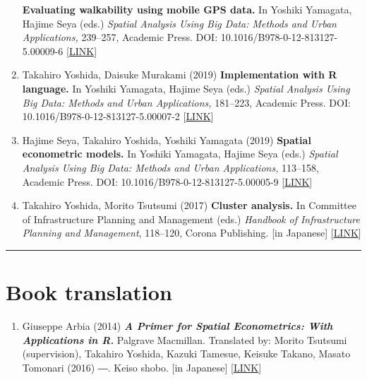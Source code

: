 \documentclass[]{book}
\providecommand{\tightlist}{%
  \setlength{\itemsep}{0pt}\setlength{\parskip}{0pt}}
\begin{document}
\begin{enumerate}
  \textbf{Evaluating walkability using mobile GPS data.}
  In Yoshiki Yamagata, Hajime Seya (eds.)
  \emph{Spatial Analysis Using Big Data: Methods and Urban Applications,} 239--257, Academic Press.
  DOI: 10.1016/B978-0-12-813127-5.00009-6 {[}\href{https://www.elsevier.com/books/spatial-analysis-using-big-data/yamagata/978-0-12-813127-5}{LINK}{]}
\item
  Takahiro Yoshida, Daisuke Murakami (2019)
  \textbf{Implementation with R language.}
  In Yoshiki Yamagata, Hajime Seya (eds.)
  \emph{Spatial Analysis Using Big Data: Methods and Urban Applications,} 181--223, Academic Press.
  DOI: 10.1016/B978-0-12-813127-5.00007-2 {[}\href{https://www.elsevier.com/books/spatial-analysis-using-big-data/yamagata/978-0-12-813127-5}{LINK}{]}
\item
  Hajime Seya, Takahiro Yoshida, Yoshiki Yamagata (2019)
  \textbf{Spatial econometric models.}
  In Yoshiki Yamagata, Hajime Seya (eds.)
  \emph{Spatial Analysis Using Big Data: Methods and Urban Applications,} 113--158, Academic Press.
  DOI: 10.1016/B978-0-12-813127-5.00005-9 {[}\href{https://www.elsevier.com/books/spatial-analysis-using-big-data/yamagata/978-0-12-813127-5}{LINK}{]}
\item
  Takahiro Yoshida, Morito Tsutsumi (2017)
  \textbf{Cluster analysis.}
  In Committee of Infrastructure Planning and Management (eds.)
  \emph{Handbook of Infrastructure Planning and Management}, 118--120, Corona Publishing.
  {[}in Japanese{]} {[}\href{http://www.coronasha.co.jp/doboku-hb.html}{LINK}{]}
\end{enumerate}

\begin{center}\rule{0.5\linewidth}{0.5pt}\end{center}

\hypertarget{book-translation}{%
\section*{Book translation}\label{book-translation}}

\begin{enumerate}
\def\labelenumi{\arabic{enumi}.}
\tightlist
\item
  Giuseppe Arbia (2014)
  \textbf{\emph{A Primer for Spatial Econometrics: With Applications in R.}} Palgrave Macmillan.
  Translated by: Morito Tsutsumi (supervision), Takahiro Yoshida, Kazuki Tamesue, Keisuke Takano, Masato Tomonari (2016) ―. Keiso shobo.
  {[}in Japanese{]} {[}\href{http://www.keisoshobo.co.jp/book/b222571.html}{LINK}{]}
\end{enumerate}
\end{document}
